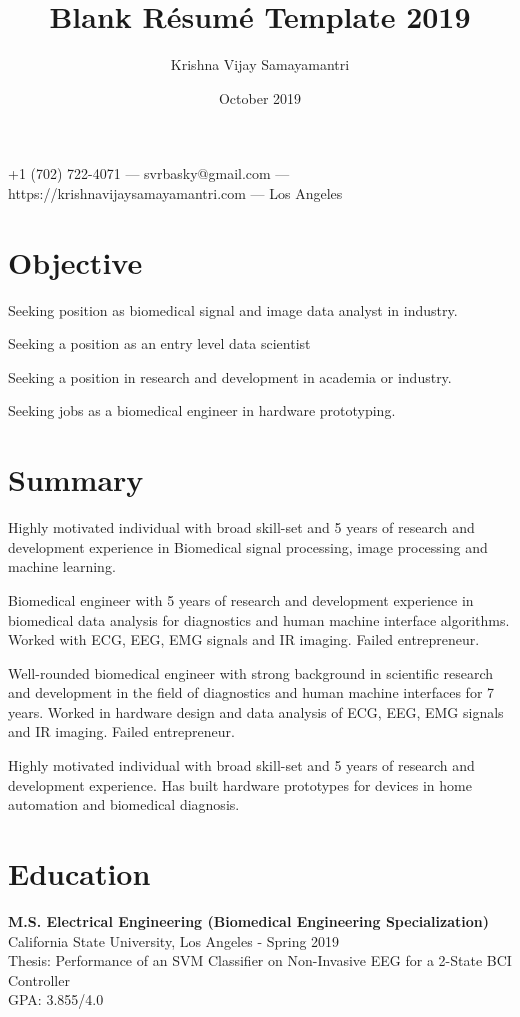 \documentclass{article}
\makeatletter
\renewcommand{\maketitle}{
\begin{center}
    {\huge\bfseries
    \theauthor}
    
    \vspace{.25em}
    +1 (702) 722-4071 ---
    svrbasky@gmail.com --- https://krishnavijaysamayamantri.com ---
    Los Angeles
\end{center}
}
\makeatother
\begin{document}
\title{Blank R\'esum\'e Template 2019}
\author{Krishna Vijay Samayamantri}
\date{October 2019}
\maketitle


\section{Objective}
Seeking position as biomedical signal and image data analyst in industry. 

\noindent Seeking a position as an entry level data scientist 

\noindent Seeking a position in research and development in academia or industry.

\noindent Seeking jobs as a biomedical engineer in hardware prototyping.

\section{Summary}
\noindent
Highly motivated individual with broad skill-set and 5 years of research and development experience in Biomedical signal processing, image processing and machine learning.

\noindent
Biomedical engineer with 5 years of research and development experience in biomedical data analysis for diagnostics and human machine interface algorithms. Worked with ECG, EEG, EMG signals and IR imaging. Failed entrepreneur.

\noindent
Well-rounded biomedical engineer with strong background in scientific research and development in the field of diagnostics and human machine interfaces for 7 years. Worked in hardware design and data analysis of ECG, EEG, EMG signals and IR imaging. Failed entrepreneur.

\noindent
Highly motivated individual with broad skill-set and 5 years of research and development experience. Has built hardware prototypes for devices in home automation and biomedical diagnosis.

\section{Education}
\textbf{M.S. Electrical Engineering (Biomedical Engineering Specialization)}\\
\noindent   
California State University, Los Angeles \hfill- Spring 2019\\
\noindent   
Thesis: Performance of an SVM Classifier on Non-Invasive EEG for a 2-State BCI Controller \\
\noindent
GPA: 3.855/4.0 \\
\end{document}

